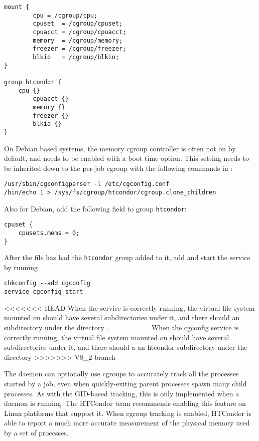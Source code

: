 \begin{verbatim}
mount {
        cpu	= /cgroup/cpu;
        cpuset	= /cgroup/cpuset;
        cpuacct = /cgroup/cpuacct;
        memory  = /cgroup/memory;
        freezer = /cgroup/freezer;
        blkio   = /cgroup/blkio;
}

group htcondor {
	cpu {}
        cpuacct {}
        memory {}
        freezer {}
        blkio {}
}
\end{verbatim}

On Debian based systems, the memory cgroup controller is often not 
on by default, and needs to be enabled with a boot time option.
This setting needs to be inherited
down to the per-job cgroup with the following commands in :

\begin{verbatim}
/usr/sbin/cgconfigparser -l /etc/cgconfig.conf
/bin/echo 1 > /sys/fs/cgroup/htcondor/cgroup.clone_children
\end{verbatim}

Also for Debian, add the following field to group \texttt{htcondor}:

\begin{verbatim}
cpuset {
	cpusets.mems = 0;
}
\end{verbatim}

After the  file has had the \texttt{htcondor} group
added to it, add and start the  service by running

\begin{verbatim}
chkconfig --add cgconfig
service cgconfig start
\end{verbatim}

<<<<<<< HEAD
When the  service is correctly running, 
the virtual file system
mounted on  should have several subdirectories under it, 
and there should an  subdirectory under the directory 
.
=======
When the cgconfig service is correctly running, the virtual file system
mounted on  should have several subdirectories under it, and
there should a an htcondor subdirectory under the directory 
>>>>>>> V8_2-branch

The  daemon can optionally use cgroups
to accurately track all the processes started by a job, 
even when quickly-exiting parent processes spawn many child processes.
As with the GID-based tracking, this is only implemented when a 
 daemon is running.  The HTCondor team recommends enabling 
this feature on Linux platforms that support it.  
When cgroup tracking is enabled, 
HTCondor is able to report a much more accurate
measurement of the physical memory used by a set of processes.

